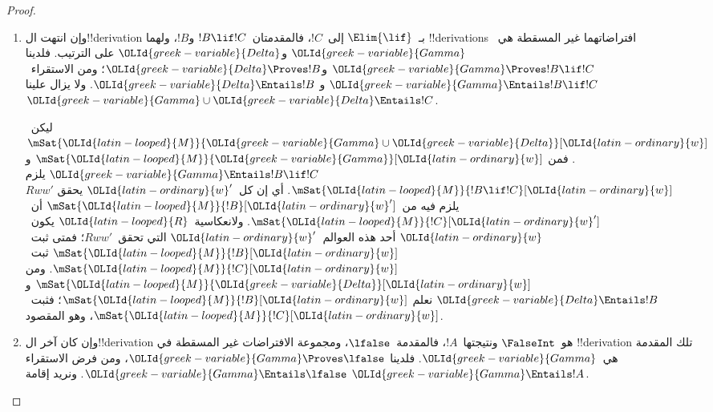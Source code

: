 \documentclass[../../../include/open-logic-section]{subfiles}
\begin{document}
\begin{proof}
\begin{enumerate}
  \item وإن انتهت ال!!{derivation} بـ~$\Elim{\lif}$ إلى~$!C$،
    فالمقدمتان~$!B \lif !C$ و$!B$، ولهما !!{derivation}s افتراضاتهما
    غير المسقطة هي~${\OLId{greek-variable}{Gamma}}$ و${\OLId{greek-variable}{Delta}}$ على الترتيب. فلدينا
    ${\OLId{greek-variable}{Gamma}} \Proves !B \lif !C$ و${\OLId{greek-variable}{Delta}} \Proves !B$؛ ومن
    الاستقراء~${\OLId{greek-variable}{Gamma}} \Entails !B \lif !C$ و
    ${\OLId{greek-variable}{Delta}} \Entails !B$. ولا يزال علينا
    ${\OLId{greek-variable}{Gamma}} \cup {\OLId{greek-variable}{Delta}} \Entails !C$.

    ليكن~$\mSat{{\OLId{latin-looped}{M}}}{{\OLId{greek-variable}{Gamma}} \cup {\OLId{greek-variable}{Delta}}}[{\OLId{latin-ordinary}{w}}]$. فمن
    $\mSat{{\OLId{latin-looped}{M}}}{{\OLId{greek-variable}{Gamma}}}[{\OLId{latin-ordinary}{w}}]$ و${\OLId{greek-variable}{Gamma}} \Entails !B \lif !C$ يلزم
    $\mSat{{\OLId{latin-looped}{M}}}{!B \lif !C}[{\OLId{latin-ordinary}{w}}]$. أي إن كل~${\OLId{latin-ordinary}{w}}'$ يحقق
    $Rww'$ يلزم فيه من~$\mSat{{\OLId{latin-looped}{M}}}{!B}[{\OLId{latin-ordinary}{w}}']$ أن~$\mSat{{\OLId{latin-looped}{M}}}{!C}[{\OLId{latin-ordinary}{w}}']$.
    ولانعكاسية~${\OLId{latin-looped}{R}}$ يكون~${\OLId{latin-ordinary}{w}}$ أحد هذه العوالم~${\OLId{latin-ordinary}{w}}'$ التي تحقق~$Rww'$؛
    فمتى ثبت~$\mSat{{\OLId{latin-looped}{M}}}{!B}[{\OLId{latin-ordinary}{w}}]$ ثبت~$\mSat{{\OLId{latin-looped}{M}}}{!C}[{\OLId{latin-ordinary}{w}}]$. ومن
    $\mSat{{\OLId{latin-looped}{M}}}{{\OLId{greek-variable}{Delta}}}[{\OLId{latin-ordinary}{w}}]$ و${\OLId{greek-variable}{Delta}} \Entails !B$ نعلم
    $\mSat{{\OLId{latin-looped}{M}}}{!B}[{\OLId{latin-ordinary}{w}}]$؛ فثبت~$\mSat{{\OLId{latin-looped}{M}}}{!C}[{\OLId{latin-ordinary}{w}}]$، وهو المقصود.

  \item وإن كان آخر ال!!{derivation} هو~$\FalseInt$ ونتيجتها~$!A$،
    فالمقدمة~$\lfalse$، ومجموعة الافتراضات غير المسقطة في
    !!{derivation} تلك المقدمة هي~${\OLId{greek-variable}{Gamma}}$. فلدينا
    ${\OLId{greek-variable}{Gamma}} \Proves \lfalse$، ومن فرض الاستقراء
    ${\OLId{greek-variable}{Gamma}} \Entails \lfalse$. ونريد إقامة
    ${\OLId{greek-variable}{Gamma}} \Entails !A$.


\end{enumerate}
\end{proof}
\end{document}
